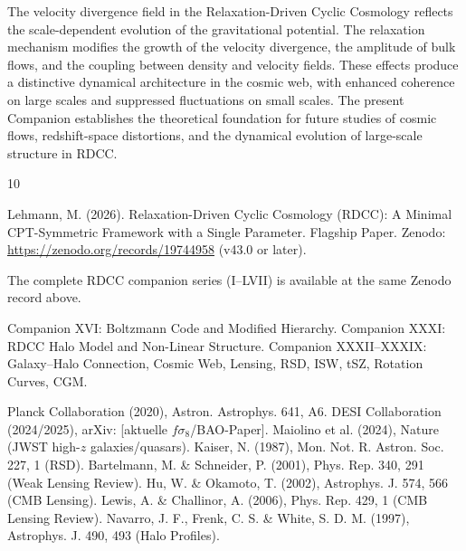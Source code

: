 \documentclass[11pt,a4paper]{article}
\begin{document}
The velocity divergence field in the Relaxation-Driven Cyclic Cosmology reflects 
the scale-dependent evolution of the gravitational potential. The relaxation 
mechanism modifies the growth of the velocity divergence, the amplitude of bulk 
flows, and the coupling between density and velocity fields. These effects produce 
a distinctive dynamical architecture in the cosmic web, with enhanced coherence on 
large scales and suppressed fluctuations on small scales. The present Companion 
establishes the theoretical foundation for future studies of cosmic flows, 
redshift-space distortions, and the dynamical evolution of large-scale structure 
in RDCC.


\begin{thebibliography}{10}

 Lehmann, M. (2026). Relaxation-Driven Cyclic Cosmology (RDCC): A Minimal CPT-Symmetric Framework with a Single Parameter. Flagship Paper. Zenodo: \url{https://zenodo.org/records/19744958} (v43.0 or later).

 The complete RDCC companion series (I--LVII) is available at the same Zenodo record above.

 Companion XVI: Boltzmann Code and Modified Hierarchy.
 Companion XXXI: RDCC Halo Model and Non-Linear Structure.
 Companion XXXII--XXXIX: Galaxy--Halo Connection, Cosmic Web, Lensing, RSD, ISW, tSZ, Rotation Curves, CGM.

 Planck Collaboration (2020), Astron. Astrophys. 641, A6.
 DESI Collaboration (2024/2025), arXiv: [aktuelle $f\sigma_8$/BAO-Paper].
 Maiolino et al. (2024), Nature (JWST high-$z$ galaxies/quasars).
 Kaiser, N. (1987), Mon. Not. R. Astron. Soc. 227, 1 (RSD).
 Bartelmann, M. \& Schneider, P. (2001), Phys. Rep. 340, 291 (Weak Lensing Review).
 Hu, W. \& Okamoto, T. (2002), Astrophys. J. 574, 566 (CMB Lensing).
 Lewis, A. \& Challinor, A. (2006), Phys. Rep. 429, 1 (CMB Lensing Review).
 Navarro, J. F., Frenk, C. S. \& White, S. D. M. (1997), Astrophys. J. 490, 493 (Halo Profiles).

\end{thebibliography}
\end{document}
